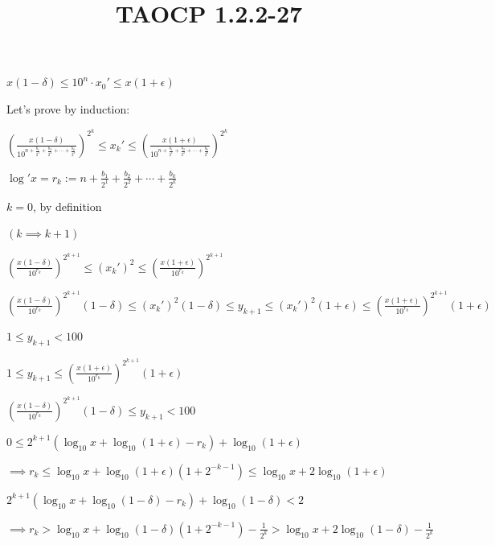 \documentclass{article}
\title{TAOCP 1.2.2\mbox{-}27}
\begin{document}
\maketitle

\( x(1-\delta) \leq 10^{n}\cdot x_{0}' \leq x(1+\epsilon) \)

Let's prove by induction:

\( {(\frac{x(1-\delta)}{10^{n+\frac{b_{1}}{2^{1}}+\frac{b_{2}}{2^{2}}+\cdots+\frac{b_{k}}{2^{k}}}})}^{2^{k}} \leq x_{k}' \leq {(\frac{x(1+\epsilon)}{10^{n+\frac{b_{1}}{2^{1}}+\frac{b_{2}}{2^{2}}+\cdots+\frac{b_{k}}{2^{k}}}})}^{2^{k}} \)

\( \log'{x} = r_{k}:= n+\frac{b_{1}}{2^{1}}+\frac{b_{2}}{2^{2}}+\cdots+\frac{b_{k}}{2^{k}} \)

\( k = 0 \), by definition

\( (k \implies k + 1) \)

\( {(\frac{x(1-\delta)}{10^{r_{k}}})}^{2^{k+1}} \leq {(x_{k}')}^{2} \leq {(\frac{x(1+\epsilon)}{10^{r_{k}}})}^{2^{k+1}} \)

\( {(\frac{x(1-\delta)}{10^{r_{k}}})}^{2^{k+1}} (1-\delta) \leq {(x_{k}')}^{2} (1-\delta) \leq y_{k+1} \leq {(x_{k}')}^{2} (1+\epsilon) \leq {(\frac{x(1+\epsilon)}{10^{r_{k}}})}^{2^{k+1}} (1+\epsilon) \)

\( 1 \leq y_{k+1} < 100 \)

\( 1 \leq y_{k+1} \leq {(\frac{x(1+\epsilon)}{10^{r_{k}}})}^{2^{k+1}} (1+\epsilon) \)

\( {(\frac{x(1-\delta)}{10^{r_{k}}})}^{2^{k+1}} (1-\delta) \leq y_{k+1} < 100 \)

\( 0 \leq 2^{k+1} (\log_{10}{x} + \log_{10}{(1+\epsilon)} - r_{k}) + \log_{10}{(1+\epsilon)} \)

\( \implies r_{k} \leq \log_{10}{x} + \log_{10}{(1+\epsilon)}(1+2^{-k-1}) \leq \log_{10}{x} + 2\log_{10}{(1+\epsilon)} \)

\( 2^{k+1} (\log_{10}{x} + \log_{10}{(1-\delta)} - r_{k}) + \log_{10}{(1-\delta)} < 2 \)

\( \implies r_{k} > \log_{10}{x} + \log_{10}{(1-\delta)}(1+2^{-k-1}) - \frac{1}{2^{k}} > \log_{10}{x} + 2\log_{10}(1-\delta) - \frac{1}{2^{k}} \)
\end{document}
